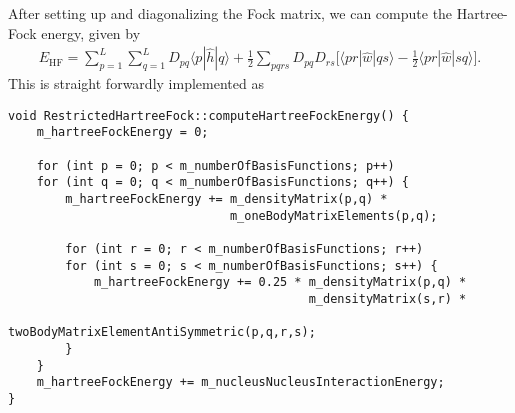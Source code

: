 \documentclass[../../master.tex]{subfiles}
\begin{document}
After setting up and diagonalizing the Fock matrix, we can compute the Hartree-Fock energy, given by
\begin{align}
E_\text{HF}=\sum_{p=1}^L\sum_{q=1}^L D_{pq} \langle p|\hat h|q\rangle + \frac{1}{2}\sum_{pqrs}D_{pq}D_{rs}\big[\langle pr|\hat w|qs\rangle - \frac{1}{2}\langle pr|\hat w|sq\rangle \big].
\end{align}
This is straight forwardly implemented as
\begin{lstlisting}[language={[std]c++}]
void RestrictedHartreeFock::computeHartreeFockEnergy() {
    m_hartreeFockEnergy = 0;

    for (int p = 0; p < m_numberOfBasisFunctions; p++)
    for (int q = 0; q < m_numberOfBasisFunctions; q++) {
        m_hartreeFockEnergy += m_densityMatrix(p,q) * 
                               m_oneBodyMatrixElements(p,q);

        for (int r = 0; r < m_numberOfBasisFunctions; r++)
        for (int s = 0; s < m_numberOfBasisFunctions; s++) {
            m_hartreeFockEnergy += 0.25 * m_densityMatrix(p,q) * 
                                          m_densityMatrix(s,r) *
                                   twoBodyMatrixElementAntiSymmetric(p,q,r,s);
        }
    }
    m_hartreeFockEnergy += m_nucleusNucleusInteractionEnergy;
}
\end{lstlisting}
\end{document}
